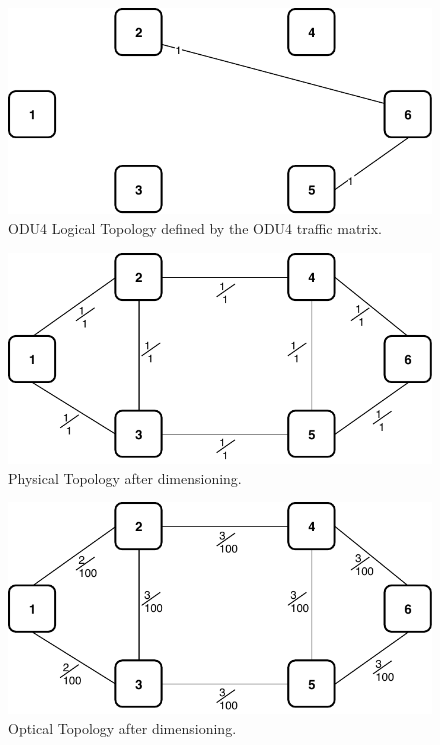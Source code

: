 \begin{figure}[h!]
\centering
\includegraphics[width=12cm]{sdf/ilp/opaque_protection/figures/logical_topology_ODU4_low}
\caption{ODU4 Logical Topology defined by the ODU4 traffic matrix.}
\label{logical_ODU4_protectionlow}
\end{figure}

\begin{figure}[h!]
\centering
\includegraphics[width=13cm]{sdf/ilp/opaque_protection/figures/physical_topology}
\caption{Physical Topology after dimensioning.}
\label{physical_protectionlow}
\end{figure}

\vspace{17pt}

\begin{figure}[h!]
\centering
\includegraphics[width=13cm]{sdf/ilp/opaque_protection/figures/optical_topology_low}
\caption{Optical Topology after dimensioning.}
\label{optical_protectionlow}
\end{figure}

